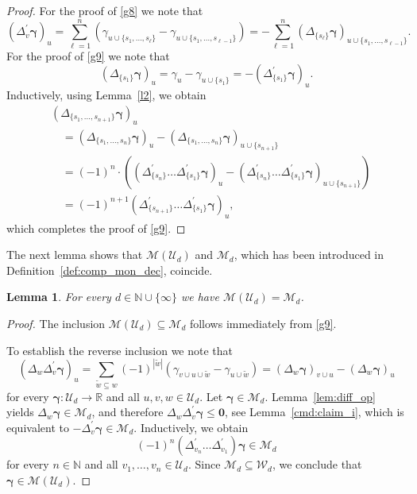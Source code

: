 \documentclass{article}
\newcommand{\R}  {{\mathbb R}}
\newcommand{\N}  {{\mathbb N}}
\newcommand{\bg}{{\boldsymbol{\gamma}}}
\newcommand{\bn}{{\boldsymbol{0}}}
\newcommand{\U}  {\mathcal{U}}
\newcommand{\W}  {\mathcal{W}}
\newcommand{\M}  {\mathcal{M}}
\theoremstyle{plain}
\newtheorem{lemma}{Lemma}
\theoremstyle{definition}
\begin{document}
\begin{proof}
For the proof of \eqref{g8}
we note that
\[
\left( \Delta^\prime_{v} \bg \right)_u
= \sum_{\ell=1}^n \left( 
\gamma_{u \cup \{s_1,\dots,s_\ell\}}
- \gamma_{u \cup \{s_1,\dots,s_{\ell-1}\}} \right) 
= - \sum_{\ell=1}^n \left( 
\Delta_{\{s_\ell\}} \bg\right)_{u \cup \{s_1,\dots,s_{\ell-1}\}}.
\]
For the proof of \eqref{g9} we note that
\[
\left( \Delta_{\{s_1\}} \bg \right)_u
= \gamma_u - \gamma_{u \cup \{s_1\} } = 
- \left( \Delta^\prime_{\{s_1\}} \bg \right)_u.
\]
Inductively, using Lemma~\ref{l2}, we obtain
\begin{align*}
&\left( \Delta_{\{s_1,\dots,s_{n+1}\}} \bg\right)_u\\
& \quad = 
\left( \Delta_{\{s_1,\dots,s_n\}} \bg\right)_u -
\left( \Delta_{\{s_1,\dots,s_n\}} \bg\right)_{u\cup \{s_{n+1}\}} \\
& \quad = 
(-1)^{n} \cdot \left(
\left( \Delta^\prime_{\{s_{n}\}} \dots 
       \Delta^\prime_{\{s_1\}} \bg \right)_u
-
\left( \Delta^\prime_{\{s_{n}\}} \dots 
       \Delta^\prime_{\{s_1\}} \bg \right)_{u \cup \{s_{n+1}\}}
\right)\\
& \quad =
(-1)^{n+1}
\left( \Delta^\prime_{\{s_{n+1}\}} \dots 
       \Delta^\prime_{\{s_1\}} \bg \right)_u,
\end{align*}
which completes the proof of \eqref{g9}.
\end{proof}

The next lemma shows that $\M(\U_d)$ and $\M_d$, 
which has been introduced in Definition~\ref{def:comp_mon_dec},
coincide.

\begin{lemma}
For every $d \in \N \cup \{\infty\}$ we have $\M(\U_d) = \M_d$.
\end{lemma}

\begin{proof}
The inclusion $\M(\U_d) \subseteq \M_d$ follows immediately from 
\eqref{g9}. 


To establish the reverse inclusion we note that
\[
\left(\Delta_w \Delta^\prime_v \bg\right)_u  =
\sum_{\widetilde{w} \subseteq w} (-1)^{| \widetilde{w} |} \left(
\gamma_{v \cup u \cup \widetilde{w}} - \gamma_{u \cup \widetilde{w}}
\right) =
\left(\Delta_w \bg\right)_{v \cup u} -
\left(\Delta_w \bg\right)_{u}
\]
for every $\bg \colon \U_d \to \R$ and all $u,v,w \in \U_d$.
Let $\bg \in \M_d$. Lemma~\ref{lem:diff_op} yields
$\Delta_w \bg \in \M_d$, and therefore 
$\Delta_w \Delta^\prime_v \bg \leq \bn$, see
Lemma~\ref{cmd:claim_i}, which is equivalent to
$-\Delta^\prime_v \bg \in \M_d$. Inductively, we obtain
\[
(-1)^n \left( \Delta^\prime_{v_n} \dots \Delta^\prime_{v_1} \right) \bg 
\in \M_d
\]
for every $n \in \N$ and all $v_1,\dots,v_n \in \U_d$.
Since $\M_d \subseteq \W_d$, we conclude that
$\bg \in \M(\U_d)$.  
\end{proof}
\end{document}
